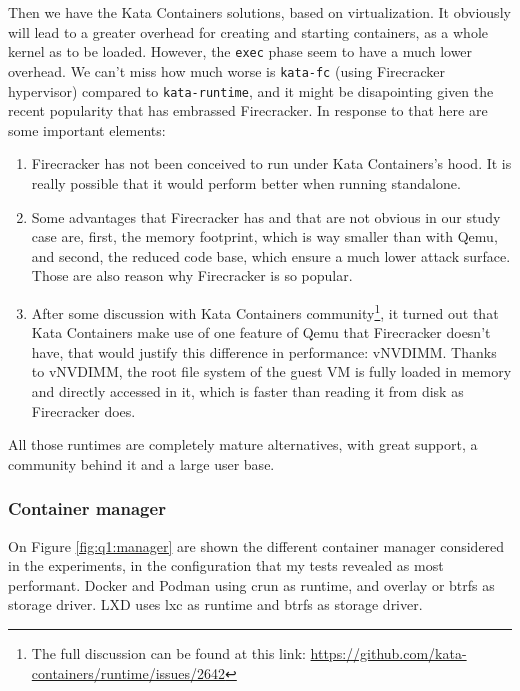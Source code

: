 Then we have the Kata Containers solutions, based on virtualization.  It obviously will lead to a greater overhead for creating and starting containers, as a whole kernel as to be loaded.  However, the \texttt{exec} phase seem to have a much lower overhead.  We can't miss how much worse is \texttt{kata-fc} (using Firecracker hypervisor) compared to \texttt{kata-runtime}, and it might be disapointing given the recent popularity that has embrassed Firecracker.  In response to that here are some important elements:
\begin{enumerate}
  \item Firecracker has not been conceived to run under Kata Containers's hood.  It is really possible that it would perform better when running standalone.
  \item Some advantages that Firecracker has and that are not obvious in our study case are, first, the memory footprint, which is way smaller than with Qemu, and second, the reduced code base, which ensure a much lower attack surface.  Those are also reason why Firecracker is so popular.
  \item After some discussion with Kata Containers community\footnote{The full discussion can be found at this link: \href{https://github.com/kata-containers/runtime/issues/2642}{https://github.com/kata-containers/runtime/issues/2642}}, it turned out that Kata Containers make use of one feature of Qemu that Firecracker doesn't have, that would justify this difference in performance: vNVDIMM.  Thanks to vNVDIMM, the root file system of the guest VM is fully loaded in memory and directly accessed in it, which is faster than reading it from disk as Firecracker does.
\end{enumerate}

All those runtimes are completely mature alternatives, with great support, a community behind it and a large user base.  

\subsubsection{Container manager}

On Figure \ref{fig:q1:manager} are shown the different container manager considered in the experiments, in the configuration that my tests revealed as most performant.  Docker and Podman using crun as runtime, and overlay or btrfs as storage driver.  LXD uses lxc as runtime and btrfs as storage driver.


